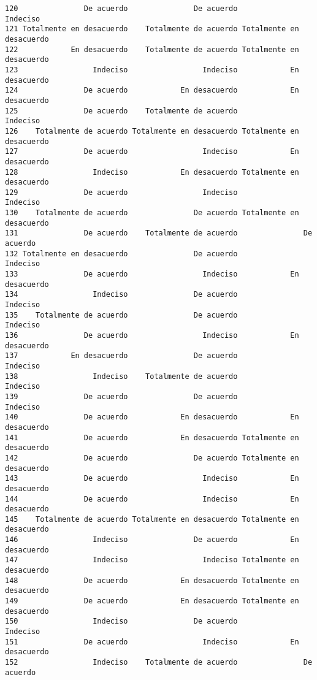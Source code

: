 \documentclass[
  letterpaper,
  DIV=11,
  numbers=noendperiod]{scrartcl}
\begin{document}
\begin{verbatim}
120               De acuerdo               De acuerdo                 Indeciso
121 Totalmente en desacuerdo    Totalmente de acuerdo Totalmente en desacuerdo
122            En desacuerdo    Totalmente de acuerdo Totalmente en desacuerdo
123                 Indeciso                 Indeciso            En desacuerdo
124               De acuerdo            En desacuerdo            En desacuerdo
125               De acuerdo    Totalmente de acuerdo                 Indeciso
126    Totalmente de acuerdo Totalmente en desacuerdo Totalmente en desacuerdo
127               De acuerdo                 Indeciso            En desacuerdo
128                 Indeciso            En desacuerdo Totalmente en desacuerdo
129               De acuerdo                 Indeciso                 Indeciso
130    Totalmente de acuerdo               De acuerdo Totalmente en desacuerdo
131               De acuerdo    Totalmente de acuerdo               De acuerdo
132 Totalmente en desacuerdo               De acuerdo                 Indeciso
133               De acuerdo                 Indeciso            En desacuerdo
134                 Indeciso               De acuerdo                 Indeciso
135    Totalmente de acuerdo               De acuerdo                 Indeciso
136               De acuerdo                 Indeciso            En desacuerdo
137            En desacuerdo               De acuerdo                 Indeciso
138                 Indeciso    Totalmente de acuerdo                 Indeciso
139               De acuerdo               De acuerdo                 Indeciso
140               De acuerdo            En desacuerdo            En desacuerdo
141               De acuerdo            En desacuerdo Totalmente en desacuerdo
142               De acuerdo               De acuerdo Totalmente en desacuerdo
143               De acuerdo                 Indeciso            En desacuerdo
144               De acuerdo                 Indeciso            En desacuerdo
145    Totalmente de acuerdo Totalmente en desacuerdo Totalmente en desacuerdo
146                 Indeciso               De acuerdo            En desacuerdo
147                 Indeciso                 Indeciso Totalmente en desacuerdo
148               De acuerdo            En desacuerdo Totalmente en desacuerdo
149               De acuerdo            En desacuerdo Totalmente en desacuerdo
150                 Indeciso               De acuerdo                 Indeciso
151               De acuerdo                 Indeciso            En desacuerdo
152                 Indeciso    Totalmente de acuerdo               De acuerdo

\end{verbatim}
\end{document}
